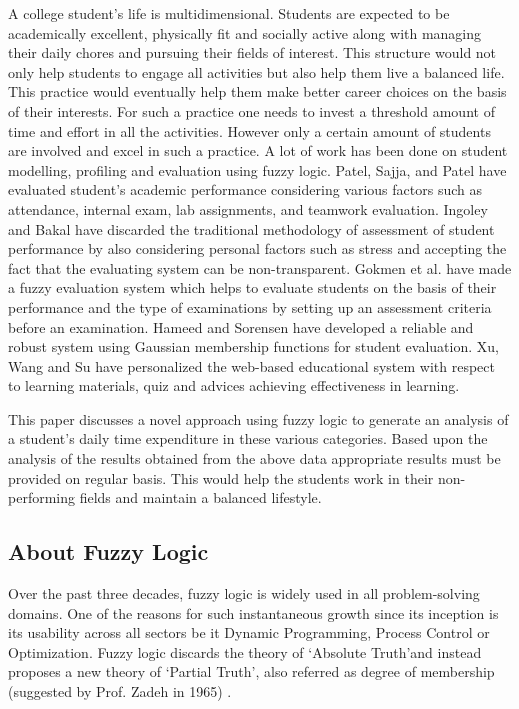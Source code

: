 \documentclass[conference]{IEEEtran}
\begin{document}
A college student\rq s life is multidimensional. Students are expected to be academically excellent, physically fit and socially active along with managing their daily chores and pursuing their fields of interest. This structure would not only help students to engage all activities but also help them live a balanced life. This practice would eventually help them make better career choices on the basis of their interests. For such a practice one needs to invest a threshold amount of time and effort in all the activities. However only a certain amount of students are involved and excel in such a practice. A lot of work has been done on student modelling, profiling and evaluation using fuzzy logic. Patel, Sajja, and Patel \cite{Patel} have evaluated student\rq s academic performance considering various factors such as attendance, internal exam, lab assignments, and teamwork evaluation. Ingoley and Bakal \cite{IEEEhowto:ingoley} have discarded the traditional methodology of assessment of student performance by also considering personal factors such as stress and accepting the fact that the evaluating system can be non-transparent. Gokmen et al. \cite{IEEEhowto:Gokmen} have made a fuzzy evaluation system which helps to evaluate students on the basis of their performance and the type of examinations by setting up an assessment criteria before an examination. Hameed and Sorensen \cite{hameed} have developed a reliable and robust system using Gaussian membership functions for student evaluation. Xu, Wang and Su \cite{Wang} have personalized the web-based educational system with respect to learning materials, quiz and advices achieving effectiveness in learning.

This paper discusses a novel approach using fuzzy logic to generate an analysis of a student\rq s daily time expenditure in these various categories. Based upon the analysis of the results obtained from the above data appropriate results must be provided on regular basis. This would help the students work in their non-performing fields and maintain a balanced lifestyle.

\subsection{About Fuzzy Logic}

Over the past three decades, fuzzy logic is widely used in all problem-solving domains. One of the reasons for such instantaneous growth since its inception is its usability across all sectors be it Dynamic Programming, Process Control or Optimization. Fuzzy logic discards the theory of \lq Absolute Truth\rq and instead proposes a new theory of \lq Partial Truth\rq, also referred as degree of membership (suggested by Prof. Zadeh in 1965) \cite{IEEEhowto:zadeh}.
\end{document}
